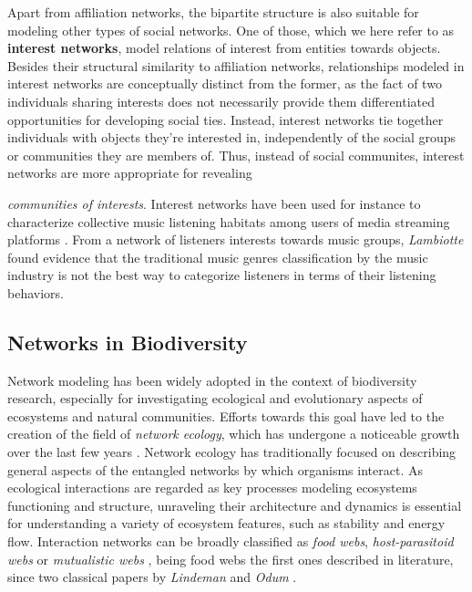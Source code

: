 Apart from affiliation networks, the bipartite structure is also suitable for modeling other types of social networks.
One of those, which we here refer to as \textbf{interest networks}, model relations of interest from entities towards objects.
Besides their structural similarity to affiliation networks, relationships modeled in interest networks are conceptually distinct from the former, as the fact of two individuals sharing interests does not necessarily provide them differentiated opportunities for developing social ties.
Instead, interest networks tie together individuals with objects they're interested in, independently of the social groups or communities they are members of. 
Thus, instead of social communites, interest networks are more appropriate for revealing {\textit{communities of interests}.
%
Interest networks have been used for instance to characterize collective music listening habitats among users of media streaming platforms \cite{Lambiotte2005}.
From a network of listeners interests towards music groups, \textit{Lambiotte} found evidence that the traditional music genres classification by the music industry is not the best way to categorize listeners in terms of their listening behaviors.



\subsection{Networks in Biodiversity}
Network modeling has been widely adopted in the context of biodiversity research, especially for investigating ecological and evolutionary aspects of ecosystems and natural communities. 
Efforts towards this goal have led to the creation of the field of \textit{network ecology}, which has undergone a noticeable growth over the last few years \cite{Borrett2014}.
Network ecology has traditionally focused on describing general aspects of the entangled networks by which organisms interact.
As ecological interactions are regarded as key processes modeling ecosystems functioning and structure, unraveling their architecture and dynamics is essential for understanding a variety of ecosystem features, such as stability and energy flow.
%
Interaction networks can be broadly classified as \textit{food webs}, \textit{host-parasitoid webs} or \textit{mutualistic webs} \cite{Ings2009}, being food webs the first ones described in literature, since two classical papers by \textit{Lindeman} and \textit{Odum} \cite{lindeman1942trophic, odum1956primary}. 
%

}
